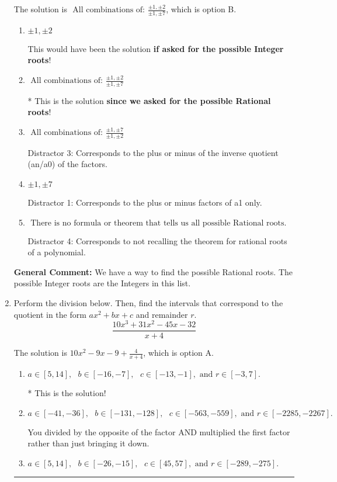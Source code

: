 \documentclass{extbook}[14pt]
\newcommand{\litem}[1]{\item #1

\rule{\textwidth}{0.4pt}}
\begin{document}
\begin{enumerate}
{The solution is \( \text{ All combinations of: }\frac{\pm 1,\pm 2}{\pm 1,\pm 7} \), which is option B.\begin{enumerate}[label=\Alph*.]
\item \( \pm 1,\pm 2 \)

This would have been the solution \textbf{if asked for the possible Integer roots}!
\item \( \text{ All combinations of: }\frac{\pm 1,\pm 2}{\pm 1,\pm 7} \)

* This is the solution \textbf{since we asked for the possible Rational roots}!
\item \( \text{ All combinations of: }\frac{\pm 1,\pm 7}{\pm 1,\pm 2} \)

 Distractor 3: Corresponds to the plus or minus of the inverse quotient (an/a0) of the factors. 
\item \( \pm 1,\pm 7 \)

 Distractor 1: Corresponds to the plus or minus factors of a1 only.
\item \( \text{ There is no formula or theorem that tells us all possible Rational roots.} \)

 Distractor 4: Corresponds to not recalling the theorem for rational roots of a polynomial.
\end{enumerate}

\textbf{General Comment:} We have a way to find the possible Rational roots. The possible Integer roots are the Integers in this list.
}
\litem{
Perform the division below. Then, find the intervals that correspond to the quotient in the form $ax^2+bx+c$ and remainder $r$.
\[ \frac{10x^{3} +31 x^{2} -45 x -32}{x + 4} \]

The solution is \( 10x^{2} -9 x -9 + \frac{4}{x + 4} \), which is option A.\begin{enumerate}[label=\Alph*.]
\item \( a \in [5, 14], \text{   } b \in [-16, -7], \text{   } c \in [-13, -1], \text{   and   } r \in [-3, 7]. \)

* This is the solution!
\item \( a \in [-41, -36], \text{   } b \in [-131, -128], \text{   } c \in [-563, -559], \text{   and   } r \in [-2285, -2267]. \)

 You divided by the opposite of the factor AND multiplied the first factor rather than just bringing it down.
\item \( a \in [5, 14], \text{   } b \in [-26, -15], \text{   } c \in [45, 57], \text{   and   } r \in [-289, -275]. \)


\end{enumerate}}
\end{enumerate}
\end{document}
